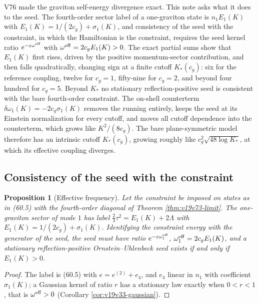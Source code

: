 \documentclass[11pt]{article}
\newtheorem{proposition}[theorem]{Proposition}
\theoremstyle{remark}
\begin{document}
V76 made the graviton self-energy divergence exact.  This note asks
what it does to the seed.  The fourth-order sector label of a
one-graviton state is \(n_1E_1(K)\) with
\(E_1(K)=1/(2c_g)+\sigma_1(K)\), and consistency of the seed with the
constraint, in which the Hamiltonian is the constraint, requires the
seed kernel ratio \(e^{-\varepsilon\omega^{\rm eff}}\) with
\(\omega^{\rm eff}=2c_gE_1(K)>0\).  The exact partial sums show that
\(E_1(K)\) first rises, driven by the positive momentum-sector
contribution, and then falls quadratically, changing sign at a finite
cutoff \(K_*(c_g)\): six for the reference coupling, twelve for
\(c_g=1\), fifty-nine for \(c_g=2\), and beyond four hundred for
\(c_g=5\).  Beyond \(K_*\) no stationary reflection-positive seed is
consistent with the bare fourth-order constraint.  The on-shell
counterterm \(\delta\omega_1(K)=-2c_g\sigma_1(K)\) removes the running
entirely, keeps the seed at its Einstein normalization for every
cutoff, and moves all cutoff dependence into the counterterm, which
grows like \(K^2/(8c_g)\).  The bare plane-symmetric model therefore has
an intrinsic cutoff \(K_*(c_g)\), growing roughly like
\(c_g^2\sqrt{48\log K_*}\), at which its effective coupling diverges.

\subsection{Consistency of the seed with the constraint}

\begin{proposition}[Effective frequency]
\label{prop:v19v77-effective}
Let the constraint be imposed on states as in (60.5) with the
fourth-order diagonal of Theorem \ref{thm:v19v73-limit}.  The
one-graviton sector of mode \(1\) has label \(\tfrac23\tau^2=E_1(K)+2\Lambda\)
with \(E_1(K)=1/(2c_g)+\sigma_1(K)\).  Identifying the constraint energy
with the generator of the seed, the seed must have ratio
\(e^{-\varepsilon\omega^{\rm eff}_1}\), \(\omega^{\rm eff}_1=2c_gE_1(K)\),
and a stationary reflection-positive Ornstein--Uhlenbeck seed exists
if and only if \(E_1(K)>0\).
\end{proposition}

\begin{proof}
The label is (60.5) with \(e=e^{(2)}+e_4\), and \(e_4\) linear in
\(n_1\) with coefficient \(\sigma_1(K)\); a Gaussian kernel of ratio
\(r\) has a stationary law exactly when \(0<r<1\), that is
\(\omega^{\rm eff}>0\) (Corollary \ref{cor:v19v33-gaussian}).
\end{proof}
\end{document}
